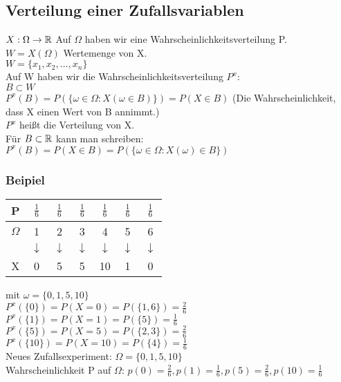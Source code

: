 \renewcommand{\ldate}{2015-10-13}

\subsection{Verteilung einer Zufallsvariablen}

$ X:\Omega \rightarrow \mathbb{R} $ Auf $ \Omega $ haben wir eine Wahrscheinlichkeitsverteilung P. \\
$ W = X(\Omega) $ Wertemenge von X.\\
$ W = \{ x_1, x_2, ..., x_n\} $\\
Auf W haben wir die Wahrscheinlichkeitsverteilung $ P^x $: \\
$ B \subset W $\\
$ P^x(B) = P(\{ \omega \in \Omega : X(\omega \in B)\}) = P(X\in B) $ (Die Wahrscheinlichkeit, dass X einen Wert von B annimmt.)\\
$ P^x $ heißt die Verteilung von X.\\
Für $ B \subset \mathbb{R} $ kann man schreiben: $ P^x(B) = P(X\in B) = P(\{\omega \in \Omega : X(\omega) \in B \}) $

\subsubsection{Beipiel}
\begin{tabular}{|c|c|c|c|c|c|c|}
\hline P & $ \frac{1}{6} $ & $ \frac{1}{6} $ & $ \frac{1}{6} $ & $ \frac{1}{6} $ & $ \frac{1}{6} $ & $ \frac{1}{6} $ \\ 
\hline $ \Omega $ & 1 & 2 & 3 & 4 & 5 & 6 \\ 
\hline  & $ \downarrow $ & $ \downarrow $ & $ \downarrow $ & $ \downarrow $ & $ \downarrow $ & $ \downarrow $ \\
\hline X & 0 & 5 & 5 & 10 & 1 & 0 \\
\hline 
\end{tabular} 
mit $ \omega = \{0,1,5,10 \} $\\
$ P^x(\{0 \}) = P(X=0) = P(\{1,6 \}) = \frac{2}{6}$\\
$ P^x(\{1 \}) = P(X=1) = P(\{5 \}) = \frac{1}{6}$\\
$ P^x(\{5 \}) = P(X=5) = P(\{2,3 \}) = \frac{2}{6}$\\
$ P^x(\{10 \}) = P(X=10) = P(\{4 \}) = \frac{1}{6}$\\
Neues Zufallsexperiment: $ \Omega = \{0,1,5,10 \}$\\
Wahrscheinlichkeit P auf $ \Omega $: 
$ p(0)=\frac{2}{6}, p(1)=\frac{1}{6}, p(5)=\frac{2}{6}, p(10)=\frac{1}{6} $

